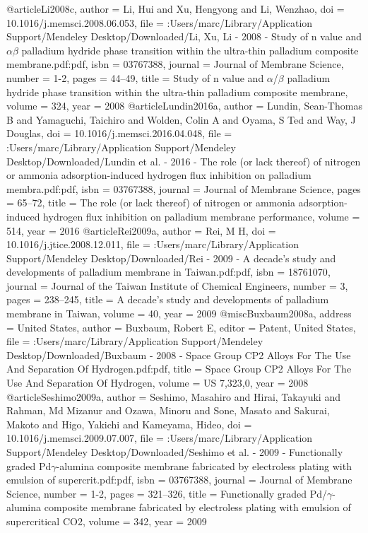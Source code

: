 @article{Li2008c,
author = {Li, Hui and Xu, Hengyong and Li, Wenzhao},
doi = {10.1016/j.memsci.2008.06.053},
file = {:Users/marc/Library/Application Support/Mendeley Desktop/Downloaded/Li, Xu, Li - 2008 - Study of n value and $\alpha$$\beta$ palladium hydride phase transition within the ultra-thin palladium composite membrane.pdf:pdf},
isbn = {03767388},
journal = {Journal of Membrane Science},
number = {1-2},
pages = {44--49},
title = {{Study of n value and $\alpha$/$\beta$ palladium hydride phase transition within the ultra-thin palladium composite membrane}},
volume = {324},
year = {2008}
}
@article{Lundin2016a,
author = {Lundin, Sean-Thomas B and Yamaguchi, Taichiro and Wolden, Colin A and Oyama, S Ted and Way, J Douglas},
doi = {10.1016/j.memsci.2016.04.048},
file = {:Users/marc/Library/Application Support/Mendeley Desktop/Downloaded/Lundin et al. - 2016 - The role (or lack thereof) of nitrogen or ammonia adsorption-induced hydrogen flux inhibition on palladium membra.pdf:pdf},
isbn = {03767388},
journal = {Journal of Membrane Science},
pages = {65--72},
title = {{The role (or lack thereof) of nitrogen or ammonia adsorption-induced hydrogen flux inhibition on palladium membrane performance}},
volume = {514},
year = {2016}
}
@article{Rei2009a,
author = {Rei, M H},
doi = {10.1016/j.jtice.2008.12.011},
file = {:Users/marc/Library/Application Support/Mendeley Desktop/Downloaded/Rei - 2009 - A decade's study and developments of palladium membrane in Taiwan.pdf:pdf},
isbn = {18761070},
journal = {Journal of the Taiwan Institute of Chemical Engineers},
number = {3},
pages = {238--245},
title = {{A decade's study and developments of palladium membrane in Taiwan}},
volume = {40},
year = {2009}
}
@misc{Buxbaum2008a,
address = {United States},
author = {Buxbaum, Robert E},
editor = {Patent, United States},
file = {:Users/marc/Library/Application Support/Mendeley Desktop/Downloaded/Buxbaum - 2008 - Space Group CP2 Alloys For The Use And Separation Of Hydrogen.pdf:pdf},
title = {{Space Group CP2 Alloys For The Use And Separation Of Hydrogen}},
volume = {US 7,323,0},
year = {2008}
}
@article{Seshimo2009a,
author = {Seshimo, Masahiro and Hirai, Takayuki and Rahman, Md Mizanur and Ozawa, Minoru and Sone, Masato and Sakurai, Makoto and Higo, Yakichi and Kameyama, Hideo},
doi = {10.1016/j.memsci.2009.07.007},
file = {:Users/marc/Library/Application Support/Mendeley Desktop/Downloaded/Seshimo et al. - 2009 - Functionally graded Pd$\gamma$-alumina composite membrane fabricated by electroless plating with emulsion of supercrit.pdf:pdf},
isbn = {03767388},
journal = {Journal of Membrane Science},
number = {1-2},
pages = {321--326},
title = {{Functionally graded Pd/$\gamma$-alumina composite membrane fabricated by electroless plating with emulsion of supercritical CO2}},
volume = {342},
year = {2009}
}
